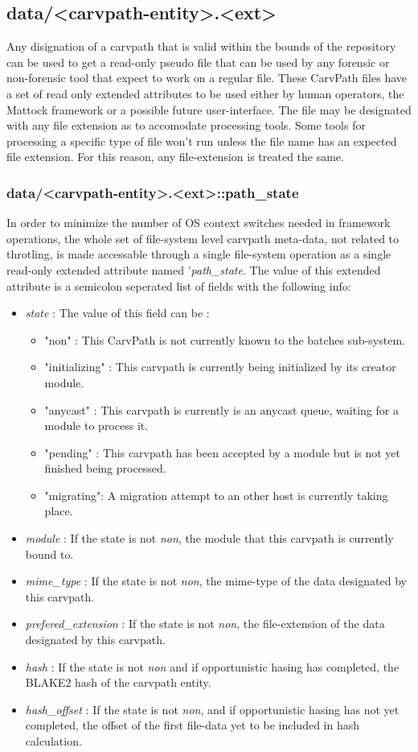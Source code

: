 \subsection{data/<carvpath-entity>.<ext>}
Any disignation of a carvpath that is valid within the bounds of the repository can be used to get a read-only pseudo file that can be used by any forensic or non-forensic tool that expect to work on a regular file. These CarvPath files have a set of read only extended attributes to be used either by human operators, the Mattock framework or a possible future user-interface.
The file may be designated with any file extension as to accomodate processing tools. Some tools for processing a specific type of file won't run unless the file name has an expected file extension. For this reason, any file-extension is treated the same.
\subsubsection{data/<carvpath-entity>.<ext>::path\_state}
In order to minimize the number of OS context switches needed in framework operations, the whole set of file-system level carvpath meta-data, not related to throtling, is made accessable through a single file-system operation as a single read-only extended attribute named '\emph{path\_state}. The value of this extended attribute is a semicolon seperated list of fields with the following info:
\begin{itemize}
\item \emph{state} : The value of this field can be :
\begin{itemize}
\item "non" : This CarvPath is not currently known to the batches sub-system. 
\item "initializing" : This carvpath is currently being initialized by its creator module.
\item "anycast" : This carvpath is currently is an anycast queue, waiting for a module to process it.
\item "pending" : This carvpath has been accepted by a module but is not yet finished being processed.
\item "migrating": A migration attempt to an other host is currently taking place.
\end{itemize}
\item \emph{module} : If the state is not \emph{non}, the module that this carvpath is currently bound to.
\item \emph{mime\_type} : If the state is not \emph{non}, the mime-type of the data designated by this carvpath.
\item \emph{prefered\_extension} : If the state is not \emph{non}, the file-extension of the data designated by this carvpath.
\item \emph{hash} : If the state is not \emph{non} and if opportunistic hasing has completed, the BLAKE2 hash of the carvpath entity.
\item \emph{hash\_offset} : If the state is not \emph{non}, and if opportunistic hasing has not yet completed, the offset of the first file-data yet to be included in hash calculation.
\end{itemize}
